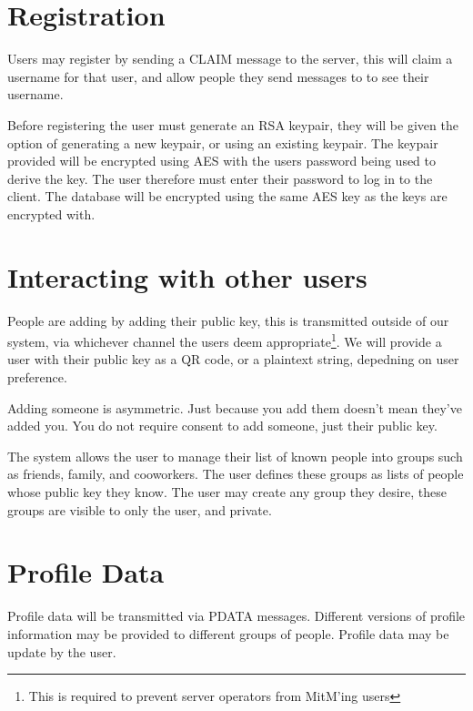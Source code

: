 
\section{Registration}
Users may register by sending a CLAIM message to the server, this will claim a
username for that user, and allow people they send messages to to see their
username.

Before registering the user must generate an RSA keypair, they will be given the
option of generating a new keypair, or using an existing keypair. The keypair
provided will be encrypted using AES with the users password being used to
derive the key. The user therefore must enter their password to log in to the
client. The database will be encrypted using the same AES key as the keys are
encrypted with.

\section{Interacting with other users}
People are adding by adding their public key, this is transmitted outside of our
system, via whichever channel the users deem appropriate\footnote{This is
required to prevent server operators from MitM'ing users}. We will provide a
user with their public key as a QR code, or a plaintext string, depedning on
user preference.

Adding someone is asymmetric. Just because you add them doesn't mean they've
added you. You do not require consent to add someone, just their public key.
    
The system allows the user to manage their list of known people into groups such
as friends, family, and cooworkers. The user defines these groups as lists of
people whose public key they know. The user may create any group they desire,
these groups are visible to only the user, and private.

\section{Profile Data}
Profile data will be transmitted via PDATA messages. Different versions of
profile information may be provided to different groups of people. Profile data
may be update by the user.

